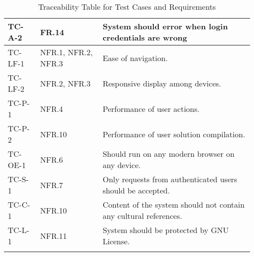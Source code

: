 \documentclass[12pt, titlepage]{article}
\begin{document}
\begin{longtable}{| p{2.5cm} | p{3cm} | p{8cm}| }
    \hline
    TC-A-2 & FR.14 & System should error when login credentials are wrong\\
    \hline
    TC-LF-1 & NFR.1, NFR.2, NFR.3 & Ease of navigation.\\
    \hline
    TC-LF-2 & NFR.2, NFR.3  & Responsive display among devices.\\
    \hline
     TC-P-1 & NFR.4 & Performance of user actions.\\
    \hline
    TC-P-2 & NFR.10 & Performance of user solution compilation.\\
     \hline
    TC-OE-1 & NFR.6 & Should run on any modern browser on any device. \\
     \hline
    TC-S-1 & NFR.7 & Only requests from authenticated users should be accepted. \\
     \hline
    TC-C-1 & NFR.10 & Content of the system should not contain any cultural references.\\
     \hline
    TC-L-1 & NFR.11 & System should be protected by GNU License.\\
     \hline
    \caption{Traceability Table for Test Cases and Requirements}
    \label{tab:trace}
\end{longtable}
\end{document}
